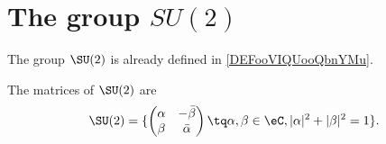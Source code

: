 
\section{The group \texorpdfstring{$SU(2)$}{SU2}}

The group \( \SU(2)\) is already defined in \ref{DEFooVIQUooQbnYMu}.

\begin{proposition}       \label{PROPooZMPLooUFyAPW}
	The matrices of \( \SU(2)\) are
	\begin{equation}
		\SU(2)=\{ \begin{pmatrix}
			\alpha & -\bar \beta \\
			\beta  & \bar \alpha
		\end{pmatrix}\tq \alpha,\beta\in \eC,| \alpha |^2+| \beta |^2=1\}.
	\end{equation}
\end{proposition}

